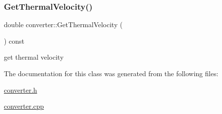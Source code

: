 \subsubsection{\texorpdfstring{Get\+Thermal\+Velocity()}{GetThermalVelocity()}}
{\footnotesize\ttfamily double converter\+::\+Get\+Thermal\+Velocity (\begin{DoxyParamCaption}{ }\end{DoxyParamCaption}) const}



get thermal velocity 



The documentation for this class was generated from the following files\+:\begin{DoxyCompactItemize}
\item 
\mbox{\hyperlink{converter_8h}{converter.\+h}}\item 
\mbox{\hyperlink{converter_8cpp}{converter.\+cpp}}\end{DoxyCompactItemize}
